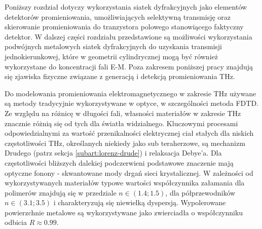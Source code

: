 Poniższy rozdział dotyczy wykorzystania siatek dyfrakcyjnych jako elementów detektorów promieniowania, umożliwiających selektywną transmisję oraz skierowanie promieniowania do tranzystora polowego stanowiącego faktyczny detektor. W dalszej części rozdziału przedstawione są możliwości wykorzystania podwójnych metalowych siatek dyfrakcyjnych do uzyskania transmisji jednokierunkowej, które w geometrii cylindrycznej mogą być również wykorzystane do koncentracji fali E-M. Poza zakresem poniższej pracy znajdują się zjawiska fizyczne związane z generacją i detekcją promieniowania THz.

Do modelowania promieniowania elektromagnetycznego w zakresie THz używane są metody tradycyjnie wykorzystywane w optyce, w  szczególności metoda FDTD. Ze względu na różnicę w długości fali, własności materiałów w zakresie THz znacznie różnią się od tych dla światła widzialnego. Kluczowymi procesami odpowiedzialnymi za wartość przenikalności elektrycznej ciał stałych dla niskich częstotliwości THz, określanych niekiedy jako sub teraherzowe, są mechanizm Drudego (patrz sekcja \ref{subart:lorenz-drude}) i relaksacja Debye'a. Dla częstotliwości bliższych dalekiej podczerwieni podstawowe znaczenie mają optyczne fonony - skwantowane mody drgań sieci krystalicznej. W zależności od wykorzystywanych materiałów typowe wartości współczynnika załamania dla polimerów znajdują się w przedziale $n \in (1.4;1.5)$, dla półprzewodników $n\in (3.1;3.5)$ i charakteryzują się niewielką dyspersją. Wypolerowane powierzchnie metalowe są wykorzystywane jako zwierciadła o współczynniku odbicia $R\approx 0.99$. \cite{lee2009principles}


